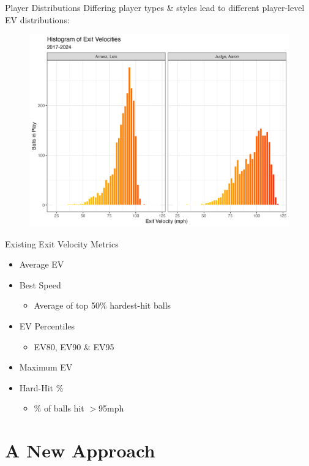 \documentclass{beamer}
\begin{document}
\begin{frame}{Player Distributions}
    Differing player types \& styles lead to different player-level EV distributions:
    \begin{figure}
        \centering
        \includegraphics[width=0.85\linewidth]{plots/playerComparison.png}
        \label{fig:player-comp}
    \end{figure}
\end{frame}

\begin{frame}{Existing Exit Velocity Metrics}
\begin{itemize}
    \item Average EV
    \item Best Speed \cite{tangoBestSpeed}
    \begin{itemize}
        \item Average of top 50\% hardest-hit balls
    \end{itemize}
    \item EV Percentiles \cite{clemensEV}
    \begin{itemize}
        \item EV80, EV90 \& EV95
    \end{itemize}
    \item Maximum EV
    \item Hard-Hit \%
    \begin{itemize}
        \item \% of balls hit $>$95mph
    \end{itemize}
\end{itemize}
\end{frame}

\section{A New Approach}

\begin{frame}[allowframebreaks]
    \printbibliography
\end{frame}
\end{document}
